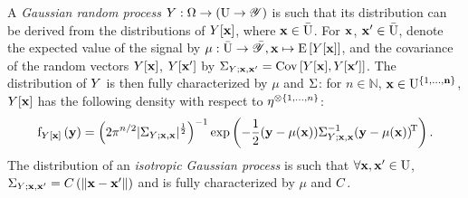 \begin{definition}
\label{def:isotropicgaussianprocess}
A {\em Gaussian random process} $Y:\Omega\to(\mathrm{U}\to\mathscr{Y})$ is such that its distribution  can be derived from the distributions of $Y[\mathbf{x}]$, where $\mathbf{x}\in\bar{\mathrm{U}}$. 
For $\mathbf{x}$, $\mathbf{x}'\in\bar{\mathrm{U}}$, denote the expected value of the signal by $\mu:\bar{\mathrm{U}}\to\bar{\mathscr{Y}},\mathbf{x}\mapsto\mathrm{E}\left[Y[\mathbf{x}]\right]$, and the covariance of the random vectors $Y[\mathbf{x}]$, $Y[\mathbf{x}']$  by $\Sigma_{Y;\mathbf{x},\mathbf{x}'}=\mathrm{Cov} \left[Y[\mathbf{x}],Y[\mathbf{x}']\right]$.
The distribution of $Y$ is then fully characterized by $\mu$ and $\Sigma$: for $n\in\mathbb{N}$,   $\mathbf{x}\in\mathrm{U}^{\{1,\ldots,\mathbf{n}\}}$, $Y[\mathbf{x}]$ has the following density with respect to $\eta^{\otimes \{1,\ldots,n\}}$: 
\begin{equation} \label{eq:pdf_norm_process}
    \mathrm{f}_{Y[\mathbf{x}]}\left(\mathbf{y}\right)=\left(2\pi^{n/2}|\Sigma_{Y;\mathbf{x},\mathbf{x}}|^{\frac12}\right)^{-1}\exp\left(-\frac12(\mathbf{y}-\mu(\mathbf{x}))\Sigma_{Y;\mathbf{x},\mathbf{x}}^{-1}(\mathbf{y}-\mu(\mathbf{x}))^{\!\mathrm{T}}\right).
\end{equation}
The distribution of an  {\em isotropic Gaussian process} is such that $\forall \mathbf{x}, \mathbf{x}'\in\mathrm{U}$,  $\Sigma_{Y;\mathbf{x},\mathbf{x}'}= C\left(\|\mathbf{x}-\mathbf{x}'\|\right)$ and is fully characterized by $\mu$ and $C$.
\end{definition}

